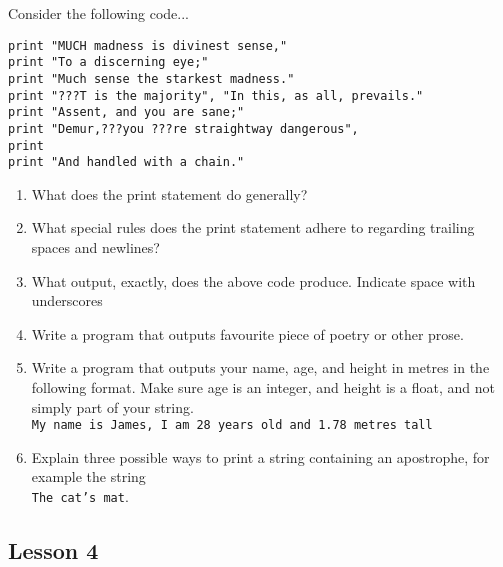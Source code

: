 Consider the following code...
\begin{lstlisting}
print "MUCH madness is divinest sense,"
print "To a discerning eye;"
print "Much sense the starkest madness."
print "???T is the majority", "In this, as all, prevails."
print "Assent, and you are sane;"
print "Demur,???you ???re straightway dangerous",
print
print "And handled with a chain."\end{lstlisting}
\begin{enumerate}
	\item What does the print statement do generally?
	\item What special rules does the print statement adhere to regarding    trailing spaces and newlines?
	\item What output, exactly, does the above code produce. Indicate    space with underscores
	\item Write a program that outputs favourite piece of poetry or other prose.
	\item Write a program that outputs your name, age, and height in    metres in the following format. Make sure age is an integer, and    height is a float, and not simply part of your string.
\\
\texttt{My name is James, I am 28 years old and 1.78 metres    tall}
	\item Explain three possible ways to print a string containing an    apostrophe, for example the string
\\
\texttt{The cat's    mat}.
\end{enumerate}

\subsection{Lesson 4}

